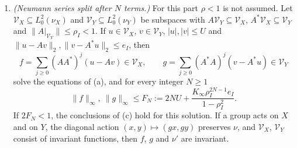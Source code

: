 \begin{lemma}
\begin{enumerate}[label=\textup{(\alph*)}]
 \[
  \rho'=\frac{\rho(1+F_X+F_Y)+e_Xe_Y}{\sqrt{(1-U_X)(1-U_Y)}};
 \]
 in the case of (d),
 \[
  \rho'\le\frac{\rho(1+2F)+U^2}{1-U}\le\frac{\rho(1+2F)+U^2+2FU}{1-U}.
 \]
 If $\pi$ is a coupling of $\mu_X$ and $\mu_Y$ whose centred conditional
 operator has norm at most $\rho(\pi)$, then $\nu'-\pi$ has zero marginals
 and, as an operator from $L^2(\mu_Y)$ to $L^2(\mu_X)$, norm at most
 $\rho'+\rho(\pi)$.
\item \emph{(Neumann series split after $N$ terms.)} For this part $\rho<1$ is not assumed. Let
 $\mathcal V_X\subseteq L^2_0(\nu_X)$ and $\mathcal V_Y\subseteq L^2_0(\nu_Y)$ be
 subspaces with $A\mathcal V_Y\subseteq\mathcal V_X$, $A^*\mathcal V_X\subseteq\mathcal V_Y$
 and $\|A|_{\mathcal V_Y}\|\le\rho_I<1$. If $u\in\mathcal V_X$, $v\in\mathcal V_Y$,
 $|u|,|v|\le U$ and $\|u-Av\|_2,\|v-A^*u\|_2\le e_I$, then
 \[
  f=\sum_{j\ge0}(AA^*)^j(u-Av)\in\mathcal V_X,\qquad
  g=\sum_{j\ge0}(A^*A)^j(v-A^*u)\in\mathcal V_Y
 \]
 solve the equations of (a), and for every integer $N\ge1$
 \[
  \|f\|_\infty,\ \|g\|_\infty\le F_N:=2NU+\frac{K_\infty\rho_I^{2N-1}e_I}{1-\rho_I^2} .
 \]
 If $2F_N<1$, the conclusions of (c) hold for this solution. If a group acts on
 $X$ and on $Y$, the diagonal action $(x,y)\mapsto(gx,gy)$ preserves
 $\nu$, and
 $\mathcal V_X$, $\mathcal V_Y$ consist of invariant functions, then $f$, $g$ and
 $\nu'$ are invariant.
\end{enumerate}
\end{lemma}

